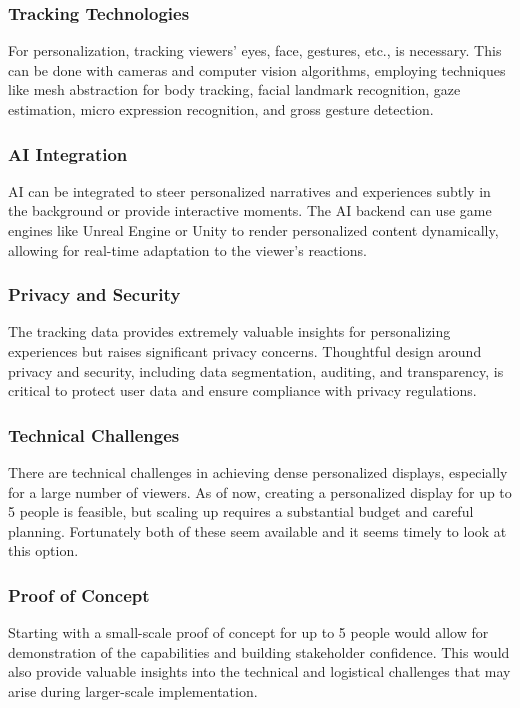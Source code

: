 \subsubsection{Tracking Technologies}
For personalization, tracking viewers' eyes, face, gestures, etc., is necessary. This can be done with cameras and computer vision algorithms, employing techniques like mesh abstraction for body tracking, facial landmark recognition, gaze estimation, micro expression recognition, and gross gesture detection.
\subsubsection{AI Integration}
AI can be integrated to steer personalized narratives and experiences subtly in the background or provide interactive moments. The AI backend can use game engines like Unreal Engine or Unity to render personalized content dynamically, allowing for real-time adaptation to the viewer's reactions.
\subsubsection{Privacy and Security}
The tracking data provides extremely valuable insights for personalizing experiences but raises significant privacy concerns. Thoughtful design around privacy and security, including data segmentation, auditing, and transparency, is critical to protect user data and ensure compliance with privacy regulations.
\subsubsection{Technical Challenges}
There are technical challenges in achieving dense personalized displays, especially for a large number of viewers. As of now, creating a personalized display for up to 5 people is feasible, but scaling up requires a substantial budget and careful planning. Fortunately both of these seem available and it seems timely to look at this option.
\subsubsection{Proof of Concept}
Starting with a small-scale proof of concept for up to 5 people would allow for demonstration of the capabilities and building stakeholder confidence. This would also provide valuable insights into the technical and logistical challenges that may arise during larger-scale implementation.
